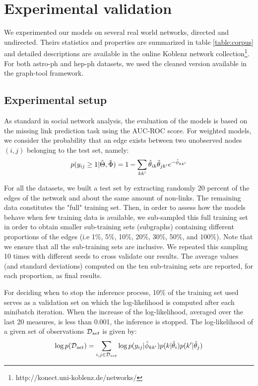 \section{Experimental validation}
\label{sec:exps}

We experimented our models on several real world networks, directed and undirected. Theirs statistics and properties are summarized in table \ref{table:corpus} and detailed descriptions are available in the online Koblenz network collection\footnote{http://konect.uni-koblenz.de/networks/}. For both astro-ph and hep-ph datasets, we used the cleaned version available in the  graph-tool framework.

\begin{table}[h]
\bgroup
\def\arraystretch{1} %
	
\egroup
\label{table:corpus}
\end{table}

\subsection{Experimental setup}
As standard in social network analysis, the evaluation of the models is based on the missing link prediction task using the AUC-ROC score. For weighted models, we consider the probability that an edge exists between two unobserved nodes $(i,j)$ belonging to the test set, namely:
\[
p(y_{ij} \geq 1 | \hat\Theta, \hat\Phi) = 1 - \sum_{kk'} \hat\theta_{ik} \hat\theta_{jk'} e^{-\hat\phi_{kk'}}
\]

For all the datasets, we built a test set by extracting randomly 20 percent of the edges of the network and about the same amount of non-links. The remaining data constitutes the "full" training set. Then, in order to assess how the models behave when few training data is available, we sub-sampled this full training set in order to obtain smaller sub-training sets (subgraphs) containing different proportions of the edges (i.e 1\%, 5\%, 10\%, 20\%, 30\%, 50\%, and 100\%). Note that we ensure that all the sub-training sets are inclusive. We repeated this sampling 10 times with different seeds to cross validate our results. The average values (and standard deviations) computed on the ten sub-training sets are reported, for each proportion, as final results.

For deciding when to stop the inference process, 10\% of the training set used serves as a validation set on which the log-likelihood is computed after each minibatch iteration. When the increase of the log-likelihood, averaged over the last 20 measures, is less than 0.001, the inference is stopped. The log-likelihood of a given set of observations $\mathcal{D}_{set}$  is given by:
\begin{equation*}
\log p(\mathcal{D}_{set}) = \sum_{i,j \in \mathcal{D}_{set}} \log p(y_{ij} | \hat\phi_{kk'}) p(k|\hat\theta_i) p(k'|\hat\theta_j)
\end{equation*}

